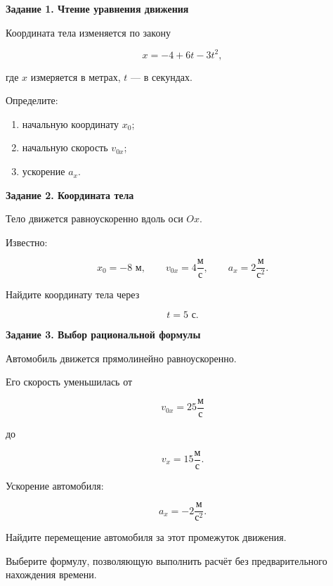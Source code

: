 \documentclass[a4paper,12pt]{article}
\begin{document}
\vspace{6mm}

\textbf{Задание 1. Чтение уравнения движения}

Координата тела изменяется по закону

\[
x=-4+6t-3t^2,
\]

где \(x\) измеряется в метрах, \(t\) --- в секундах.

Определите:

\begin{enumerate}[label=\alph*)]
  \item начальную координату \(x_0\);
  \item начальную скорость \(v_{0x}\);
  \item ускорение \(a_x\).
\end{enumerate}

\vspace{7mm}

\textbf{Задание 2. Координата тела}

Тело движется равноускоренно вдоль оси \(Ox\).

Известно:

\[
x_0=-8\text{ м},
\qquad
v_{0x}=4\frac{\text{м}}{\text{с}},
\qquad
a_x=2\frac{\text{м}}{\text{с}^2}.
\]

Найдите координату тела через

\[
t=5\text{ с}.
\]

\vspace{7mm}

\textbf{Задание 3. Выбор рациональной формулы}

Автомобиль движется прямолинейно равноускоренно.

Его скорость уменьшилась от

\[
v_{0x}=25\frac{\text{м}}{\text{с}}
\]

до

\[
v_x=15\frac{\text{м}}{\text{с}}.
\]

Ускорение автомобиля:

\[
a_x=-2\frac{\text{м}}{\text{с}^2}.
\]

Найдите перемещение автомобиля за этот промежуток движения.

Выберите формулу, позволяющую выполнить расчёт без предварительного нахождения времени.

\clearpage

\thispagestyle{plain}
\end{document}
